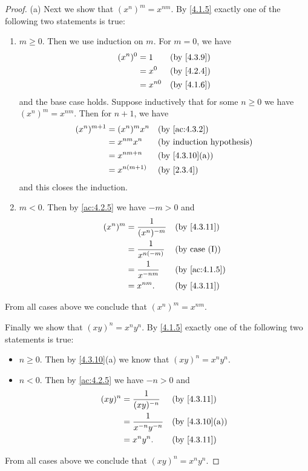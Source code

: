 \begin{proof}{(a)}
  Next we show that \((x^n)^m = x^{nm}\).
  By \cref{4.1.5} exactly one of the following two statements is true:
  \begin{enumerate}[label=(\Roman*)]
    \item \(m \geq 0\).
          Then we use induction on \(m\).
          For \(m = 0\), we have
          \begin{align*}
            (x^n)^0 & = 1      &  & \by{4.3.9} \\
                    & = x^0    &  & \by{4.2.4} \\
                    & = x^{n0} &  & \by{4.1.6}
          \end{align*}
          and the base case holds.
          Suppose inductively that for some \(n \geq 0\) we have \((x^n)^m = x^{nm}\).
          Then for \(n + 1\), we have
          \begin{align*}
            (x^n)^{m + 1} & = (x^n)^m x^n  &  & \by{ac:4.3.2}                \\
                          & = x^{nm} x^n   &  & \byIH                        \\
                          & = x^{nm + n}   &  & \text{(by \cref{4.3.10}(a))} \\
                          & = x^{n(m + 1)} &  & \by{2.3.4}
          \end{align*}
          and this closes the induction.
    \item \(m < 0\).
          Then by \cref{ac:4.2.5} we have \(-m > 0\) and
          \begin{align*}
            (x^n)^m & = \dfrac{1}{(x^n)^{-m}} &  & \by{4.3.11}          \\
                    & = \dfrac{1}{x^{n(-m)}}  &  & \text{(by case (I))} \\
                    & = \dfrac{1}{x^{-nm}}    &  & \by{ac:4.1.5}        \\
                    & = x^{nm}.               &  & \by{4.3.11}
          \end{align*}
  \end{enumerate}
  From all cases above we conclude that \((x^n)^m = x^{nm}\).

  Finally we show that \((xy)^n = x^n y^n\).
  By \cref{4.1.5} exactly one of the following two statements is true:
  \begin{itemize}
    \item \(n \geq 0\).
          Then by \cref{4.3.10}(a) we know that \((xy)^n = x^n y^n\).
    \item \(n < 0\).
          Then by \cref{ac:4.2.5} we have \(-n > 0\) and
          \begin{align*}
            (xy)^n & = \dfrac{1}{(xy)^{-n}}     &  & \by{4.3.11}                  \\
                   & = \dfrac{1}{x^{-n} y^{-n}} &  & \text{(by \cref{4.3.10}(a))} \\
                   & = x^n y^n.                 &  & \by{4.3.11}
          \end{align*}
  \end{itemize}
  From all cases above we conclude that \((xy)^n = x^n y^n\).
\end{proof}

